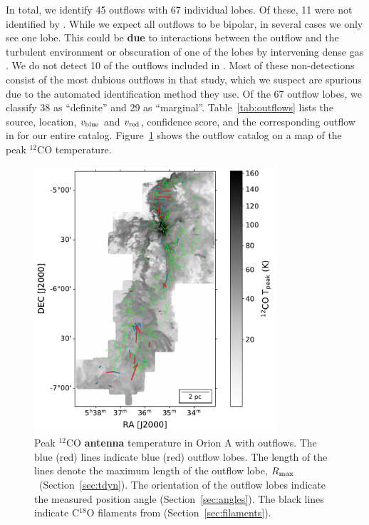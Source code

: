 \documentclass[twocolumn]{aastex63}
\newcommand{\co}[1][]{\ensuremath{^{#1}}CO}
\begin{document}
In total, we identify 45 outflows with 67 individual lobes. Of these, 11 were not identified by \citet{Tanabe19}. While we expect all outflows to be bipolar, in several cases we only see one lobe. This could be \textbf{due} to interactions between the outflow and the turbulent environment or obscuration of one of the lobes by intervening dense gas \citep{Offner11}.  We do not detect 10 of the outflows included in \citet{Tanabe19}. Most of these non-detections consist of the most dubious outflows in that study, which we suspect are spurious due to the automated identification method they use. Of the 67 outflow lobes, we classify 38 as ``definite'' and 29 as ``marginal''. Table~\ref{tab:outflows} lists the source, location, $v_{\rm blue}$ and $v_{\rm red}$, confidence score, and the corresponding outflow in \citet{Tanabe19} for our entire catalog. Figure~\ref{fig:overview} shows the outflow catalog on a map of the peak \co[12]{} temperature.

\begin{figure}
\centering
\includegraphics[width=0.8\textwidth]{overview.pdf}
\caption{Peak \co[12]{} \textbf{antenna} temperature in Orion A with outflows. The blue (red) lines indicate blue (red) outflow lobes. The length of the lines denote the maximum length of the outflow lobe, $R_{\rm max}$~(Section~\ref{sec:tdyn}). The orientation of the outflow lobes indicate the measured position angle (Section~\ref{sec:angles}). The black lines indicate C$^{18}$O filaments from \citet{Suri19} (Section~\ref{sec:filaments}). \label{fig:overview}}
\end{figure}
\end{document}
